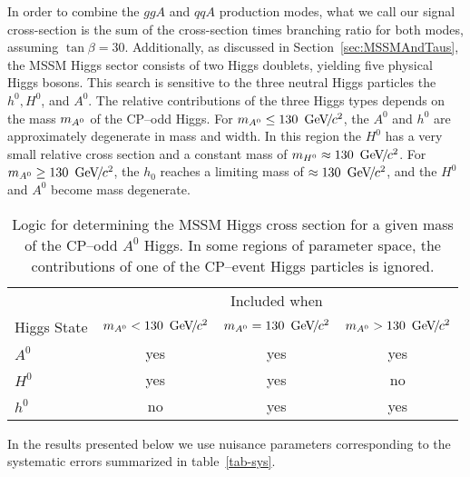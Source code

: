 In order to combine the $ggA$ and $qqA$ production modes, what we call our
signal cross-section is the sum of the cross-section times branching ratio for
both modes, assuming \mbox{$\tan\beta = 30$}.  Additionally, as discussed in
Section~\ref{sec:MSSMAndTaus}, the MSSM Higgs sector consists of two Higgs
doublets, yielding five physical Higgs bosons.  This search is sensitive to
the three neutral Higgs particles the $h^0, H^0$, and $A^0$.  The relative
contributions of the three Higgs types depends on the mass $\ma$ of the CP--odd 
Higgs.  For $m_{A^0} \leq
130~{\,\text{Ge\hspace{-.08em}V\hspace{-0.16em}/\hspace{-0.08em}}c^\text{2}}$, the $A^0$ and $h^0$ are approximately degenerate in mass and width.
In this region the $H^0$ has a very small relative cross section and a constant
mass of $m_{H^0} \approx 130~{\,\text{Ge\hspace{-.08em}V\hspace{-0.16em}/\hspace{-0.08em}}c^\text{2}}$.
For $m_{A^0} \geq 130~{\,\text{Ge\hspace{-.08em}V\hspace{-0.16em}/\hspace{-0.08em}}c^\text{2}}$, the $h_0$ reaches a limiting mass of $\approx
130~{\,\text{Ge\hspace{-.08em}V\hspace{-0.16em}/\hspace{-0.08em}}c^\text{2}}$, and the $H^0$ and $A^0$ become mass degenerate.   

\begin{table}
  \centering
  \begin{tabular}{|l|c|c|c|} 
    \hline
                & \multicolumn{3}{|c|}{Included when} \\
    Higgs State & $m_{A^0} < 130~{\,\text{Ge\hspace{-.08em}V\hspace{-0.16em}/\hspace{-0.08em}}c^\text{2}}$ & $m_{A^0} = 130~{\,\text{Ge\hspace{-.08em}V\hspace{-0.16em}/\hspace{-0.08em}}c^\text{2}}$ & $m_{A^0} > 130~{\,\text{Ge\hspace{-.08em}V\hspace{-0.16em}/\hspace{-0.08em}}c^\text{2}}$ \\
    \hline
    $A^0$       & yes & yes & yes \\
    $H^0$       & yes & yes & no \\
    $h^0$       & no & yes & yes \\
    \hline
  \end{tabular}
  \caption[Contributions of different MSSM Higgs boson types at different
  $\ma$.]{Logic for determining the MSSM Higgs cross section for a given mass of
  the CP--odd $A^0$ Higgs.  In some regions of parameter space, the
  contributions of one of the
  CP--event Higgs particles is ignored.}
  \label{tab:HiggsXSectionCombination}
\end{table}



In the results presented below we use nuisance parameters corresponding
to the systematic errors summarized in table~\ref{tab-sys}.


